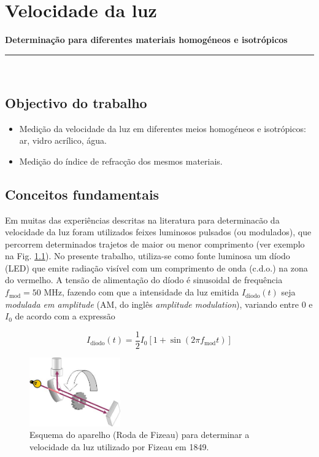 \documentclass[a4paper,twoside,11pt]{report}      %
\newcommand{\HRule}{\rule{\linewidth}{0.5mm}}
\begin{document}
	
\chapter{\huge{Velocidade da luz}}
\large {\bf {Determinação para diferentes materiais homogéneos e isotrópicos}}\\
	\HRule \\%

\section{\sf Objectivo do trabalho}
\begin{itemize}
\item Medição da velocidade da luz em diferentes meios homogéneos e isotrópicos: ar, vidro acrílico, água.
\item Medição do índice de refracção dos mesmos materiais.
\end{itemize}

\section{\sf Conceitos fundamentais}
Em muitas das experiências descritas na literatura para determinacão da velocidade da luz foram utilizados feixes luminosos pulsados (ou modulados), que percorrem determinados trajetos de maior ou menor comprimento (ver exemplo na Fig. \ref{fig:Fizeau}). 
No presente trabalho, utiliza-se como fonte luminosa um díodo (LED) que emite radiação  visível com um comprimento de onda (c.d.o.) na zona do vermelho. A tensão de alimentação do díodo é sinusoidal de frequência $f_{\textrm{mod}}=50$ MHz, fazendo com que a intensidade da luz emitida $I_{\textrm{diodo}}(t)$ seja \emph{modulada em amplitude} (AM, do inglês \emph{amplitude modulation}), variando entre 0 e $I_0$ de acordo com a expressão

\begin{equation*}
	\label{eq:f_am}
		I_{\textrm{diodo}}(t) = \frac{1}{2}I_0 [1+ \sin ( 2\pi f_{\textrm{mod}} t)]
\end{equation*}

\begin{figure}
	[ht!b]  \centering 
	\includegraphics[width=0.35\textwidth]{Fizeau}
	\caption{Esquema do aparelho (Roda de Fizeau) para determinar a velocidade da luz utilizado por Fizeau em 1849. \label{fig:Fizeau}} 
\end{figure}
\end{document}
